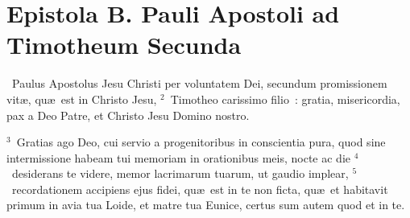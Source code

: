 {\centering \section*{Epistola B. Pauli Apostoli ad Timotheum Secunda}}\thispagestyle{empty}

~\lettrine[lines=10,image=true,loversize=0.05,lraise=-0.03]{P}{}aulus Apostolus Jesu Christi per voluntatem Dei, secundum promissionem vit\ae , qu\ae\ est in Christo Jesu,
${}^{2}$~Timotheo carissimo filio~: gratia, misericordia, pax a Deo Patre, et Christo Jesu Domino nostro.


${}^{3}$~Gratias ago Deo, cui servio a progenitoribus in conscientia pura, quod sine intermissione habeam tui memoriam in orationibus meis, nocte ac die
${}^{4}$~desiderans te videre, memor lacrimarum tuarum, ut gaudio implear,
${}^{5}$~recordationem accipiens ejus fidei, qu\ae\ est in te non ficta, qu\ae\ et habitavit primum in avia tua Loide, et matre tua Eunice, certus sum autem quod et in te.


